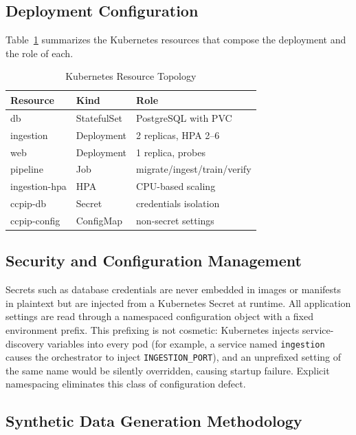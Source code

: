 \documentclass[conference]{IEEEtran}
\begin{document}
\subsection{Deployment Configuration}

Table~\ref{tab:deploy} summarizes the Kubernetes resources that compose the deployment and the role of each.

\begin{table}[t]
\caption{Kubernetes Resource Topology}
\label{tab:deploy}
\centering
\footnotesize
\begin{tabular}{@{}llp{2.8cm}@{}}
\toprule
\textbf{Resource} & \textbf{Kind} & \textbf{Role} \\
\midrule
db & StatefulSet & PostgreSQL with PVC \\
ingestion & Deployment & 2 replicas, HPA 2--6 \\
web & Deployment & 1 replica, probes \\
pipeline & Job & migrate/ingest/train/verify \\
ingestion-hpa & HPA & CPU-based scaling \\
ccpip-db & Secret & credentials isolation \\
ccpip-config & ConfigMap & non-secret settings \\
\bottomrule
\end{tabular}
\end{table}

\subsection{Security and Configuration Management}

Secrets such as database credentials are never embedded in images or manifests in plaintext but are injected from a Kubernetes Secret at runtime. All application settings are read through a namespaced configuration object with a fixed environment prefix. This prefixing is not cosmetic: Kubernetes injects service-discovery variables into every pod (for example, a service named \texttt{ingestion} causes the orchestrator to inject \texttt{INGESTION\_PORT}), and an unprefixed setting of the same name would be silently overridden, causing startup failure. Explicit namespacing eliminates this class of configuration defect.

\subsection{Synthetic Data Generation Methodology}
\end{document}
